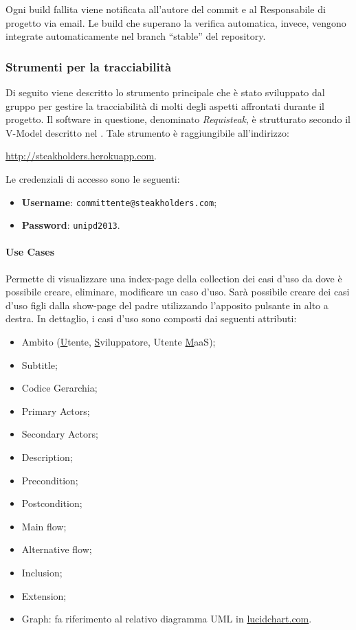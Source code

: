 	Ogni build fallita viene notificata all'autore del commit e al Responsabile di progetto via email. Le build che superano la verifica automatica, invece, vengono integrate automaticamente nel branch ``stable'' del repository.
	
	\subsubsection{Strumenti per la tracciabilità}
	\label{requisteak}
	Di seguito viene descritto lo strumento principale che è stato sviluppato dal gruppo per gestire la tracciabilità di molti degli aspetti affrontati durante il progetto. Il software in questione, denominato \emph{Requisteak}, è strutturato secondo il V-Model descritto nel \PianoDiQualifica{}.
	Tale strumento è raggiungibile all'indirizzo:
     \begin{center}
         \url{http://steakholders.herokuapp.com}.
     \end{center} 
     Le credenziali di accesso sono le seguenti:
     \begin{itemize}
        \item \textbf{Username}: \texttt{committente@steakholders.com};
        \item \textbf{Password}: \texttt{unipd2013}.
     \end{itemize}
     
     \paragraph{Use Cases}
     Permette di visualizzare una index-page della collection dei casi d'uso da dove è possibile creare, eliminare, modificare un caso d'uso. Sarà possibile creare dei casi d'uso figli dalla show-page del padre utilizzando l'apposito pulsante in alto a destra.
     In dettaglio, i casi d'uso sono composti dai seguenti attributi:
     \begin{itemize}
     	\item Ambito (\underline{U}tente, \underline{S}viluppatore, Utente \underline{M}aaS);
     	\item Subtitle;
     	\item Codice Gerarchia;
     	\item Primary Actors;
     	\item Secondary Actors;
     	\item Description;
     	\item Precondition;
     	\item Postcondition;
     	\item Main flow;
     	\item Alternative flow;
     	\item Inclusion;
     	\item Extension;
     	\item Graph: fa riferimento al relativo diagramma UML in \url{lucidchart.com}.
     \end{itemize}
     
